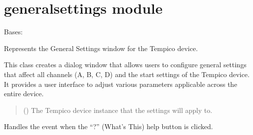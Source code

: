 \documentclass[letterpaper,10pt,english]{sphinxmanual}
\begin{document}
\sphinxstepscope


\chapter{generalsettings module}
\label{\detokenize{generalsettings:module-generalsettings}}\label{\detokenize{generalsettings:generalsettings-module}}\label{\detokenize{generalsettings::doc}}

\begin{fulllineitems}
\label{\detokenize{generalsettings:generalsettings.GeneralSettingsWindow}}
\pysigstartsignatures
{}
\pysigstopsignatures
\sphinxAtStartPar
Bases: 

\sphinxAtStartPar
Represents the General Settings window for the Tempico device.

\sphinxAtStartPar
This class creates a dialog window that allows users to configure general settings that affect all channels (A, B, C, D) and the start settings of the Tempico device. It provides a user interface to adjust various parameters applicable across the entire device.
\begin{quote}\begin{description}
\sphinxAtStartPar
{} () \textendash{} The Tempico device instance that the settings will apply to.

\end{description}\end{quote}

\begin{fulllineitems}
\label{\detokenize{generalsettings:generalsettings.GeneralSettingsWindow.event}}
\pysigstartsignatures
{}
\pysigstopsignatures
\sphinxAtStartPar
Handles the event when the “?” (What’s This) help button is clicked.


\end{fulllineitems}
\end{fulllineitems}
\end{document}
